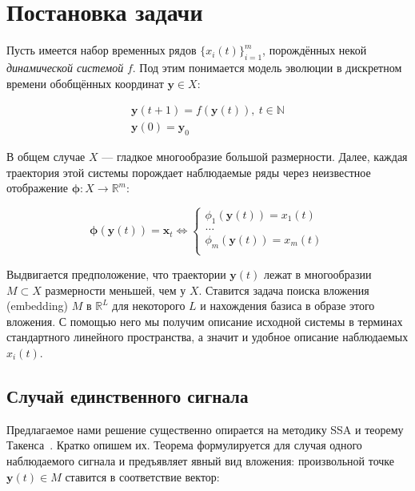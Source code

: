 	\section{Постановка задачи}\label{sec:problem_statement}
		 
		 Пусть имеется набор временных рядов $ \{x_i(t)\}_{i=1}^m $, порождённых некой \emph{динамической системой} $f$. Под этим понимается модель эволюции в дискретном времени обобщённых координат $ \mathbf{y} \in X $:
		 	
		 \begin{gather*}
		 	\mathbf{y}(t + 1) = f(\mathbf{y}(t)), \ t \in \mathbb{N} \\
		 	\mathbf{y}(0) = \mathbf{y}_0
		 \end{gather*}
		 	
		 В общем случае $ X $ --- гладкое многообразие большой размерности. Далее, каждая траектория этой системы порождает наблюдаемые ряды через неизвестное отображение $ \boldsymbol{\phi}: X \to \mathbb{R}^m $:
		 	
		 \begin{equation*}
		 	\boldsymbol{\phi}(\mathbf{y}(t)) = \mathbf{x}_t \Leftrightarrow \begin{cases}
		 		\phi_1(\mathbf{y}(t)) = x_1(t) \\
		 		\ldots \\
		 		\phi_m(\mathbf{y}(t)) = x_m(t) \\
		 	\end{cases}
		 \end{equation*}
		 	
		 Выдвигается предположение, что траектории $ \mathbf{y}(t) $ лежат в многообразии $ M \subset X $ размерности меньшей, чем у $ X $. Ставится задача поиска вложения (embedding) $ M $ в $ \mathbb{R}^{L} $ для некоторого $ L $ и нахождения базиса в образе этого вложения. С помощью него мы получим описание исходной системы в терминах стандартного линейного пространства, а значит и удобное описание наблюдаемых $ x_i(t) $.
		 
		 \subsection*{Случай единственного сигнала}
		 
		 	Предлагаемое нами решение существенно опирается на методику SSA и теорему Такенса~\cite{citeulike:2735031}. Кратко опишем их. Теорема формулируется для случая одного наблюдаемого сигнала и предъявляет явный вид вложения: произвольной точке $ \mathbf{y}(t) \in M $ ставится в соответствие вектор:
		 	
